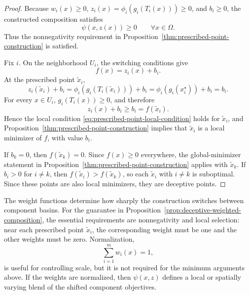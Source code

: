 \documentclass[11pt,a4paper]{article}
\theoremstyle{remark}
\theoremstyle{plain}
\begin{document}
\begin{proof}
	Because \(w_i(x)\ge0\), \(z_i(x)=\phi_i(g_i(T_i(x)))\ge0\), and \(b_i\ge0\),
	the constructed composition satisfies
	\[
	\psi(x,z(x))\ge0
	\qquad
	\forall x\in\Omega.
	\]
	Thus the nonnegativity requirement in
	Proposition~\ref{thm:prescribed-point-construction} is satisfied.
	
	Fix \(i\). On the neighborhood \(U_i\), the switching conditions give
	\[
	f(x)=z_i(x)+b_i.
	\]
	At the prescribed point \(\tilde x_i\),
	\[
	z_i(\tilde x_i)+b_i
	=
	\phi_i(g_i(T_i(\tilde x_i)))+b_i
	=
	\phi_i(g_i(x_i^\star))+b_i
	=
	b_i.
	\]
	For every \(x\in U_i\), \(g_i(T_i(x))\ge0\), and therefore
	\[
	z_i(x)+b_i\ge b_i=f(\tilde x_i).
	\]
	Hence the local condition
	\eqref{eq:prescribed-point-local-condition} holds for \(\tilde x_i\), and
	Proposition~\ref{thm:prescribed-point-construction} implies that
	\(\tilde x_i\) is a local minimizer of \(f\), with value \(b_i\).
	
	If \(b_k=0\), then \(f(\tilde x_k)=0\). Since \(f(x)\ge0\) everywhere,
	the global-minimizer statement in
	Proposition~\ref{thm:prescribed-point-construction} applies with
	\(\tilde x_k\). If \(b_i>0\) for \(i\ne k\), then
	\(f(\tilde x_i)>f(\tilde x_k)\), so each \(\tilde x_i\) with \(i\ne k\) is
	suboptimal. Since these points are also local minimizers, they are deceptive
	points. 
\end{proof}

The weight functions determine how sharply the construction switches between
component basins. For the guarantee in
Proposition~\ref{prop:deceptive-weighted-composition}, the essential
requirements are nonnegativity and local selection: near each prescribed point
\(\tilde x_i\), the corresponding weight must be one and the other weights
must be zero. Normalization,
\[
	\sum_{i=1}^m w_i(x)=1,
\]
is useful for controlling scale, but it is not required for the minimum
arguments above. If the weights are normalized, then \(\psi(x,z)\) defines a local
or spatially varying blend of the shifted component objectives. 
\end{document}
